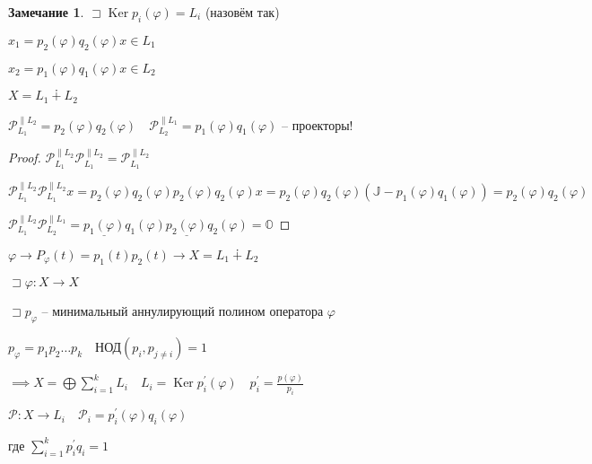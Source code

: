 \documentclass{book}
\newcommand{\p}[1]{#1^{\prime}}
\DeclareMathOperator{\Ker}{Ker}
\theoremstyle{definition}
\newtheorem*{note}{Замечание}
\begin{document}
\begin{note}
    $\sqsupset \Ker p_i\left( \varphi \right)  = L_i$ (назовём так)

    $x_1 = p_2\left( \varphi \right) q_2\left( \varphi \right) x\in L_1$
    
    $x_2 = p_1\left( \varphi \right) q_1\left( \varphi \right) x\in L_2$

    $X = L_1\dotplus L_2$
\end{note}

\begin{lemma}
    $\mathscr{P}_{L_1}^{\parallel L_2} = p_2(\varphi)q_2\left( \varphi \right) \quad \mathscr{P}_{L_2}^{\parallel L_1} = p_1\left( \varphi \right) q_1\left( \varphi \right) $ -- проекторы!
\end{lemma}
\begin{proof}
    $\mathscr{P}_{L_1}^{\parallel L_2} \mathscr{P}_{L_1}^{\parallel L_2} = \mathscr{P}_{L_1}^{\parallel L_2}$

    $\mathscr{P}_{L_1}^{\parallel L_2}\mathscr{P}_{L_1}^{\parallel L_2}x = p_2\left( \varphi \right) q_2\left( \varphi \right) p_2\left( \varphi \right) q_2\left( \varphi \right) x = p_2\left( \varphi \right) q_2\left( \varphi \right) \left( \mathds{J} - p_1\left( \varphi \right) q_1\left( \varphi \right)  \right)  = p_2\left( \varphi \right) q_2\left( \varphi \right) $ 

    $\mathcal{P}_{L_1}^{\parallel L_2}\mathcal{P}_{L_2}^{\parallel L_1} = \underline{p_1\left( \varphi \right)} q_1\left( \varphi \right) \underline{p_2\left( \varphi \right)} q_2\left( \varphi \right)  = \mathds{O}$
\end{proof}


$\varphi \to P_{\varphi}(t) = p_1(t)p_2(t) \to X = L_1 \dotplus L_2$

\begin{theorem}
    $\sqsupset \varphi:X\to X$

    $\sqsupset p_{\varphi}$ -- минимальный аннулирующий полином оператора $\varphi$

    $p_{\varphi} = p_1 p_2 \ldots p_k\quad \text{НОД}\left( p_i, p_{j\neq i} \right)=1 $ 

    $\implies X = \bigoplus \sum_{i=1}^{k} L_i\quad L_i = \Ker \p p_i\left( \varphi \right) \quad \p p_i = \frac{p\left( \varphi \right) }{p_i}$ 

    $\mathscr{P}:X \to L_i\quad \mathscr{P}_i = \p p_i\left( \varphi \right) q_i\left( \varphi \right) $

   где $\sum_{i=1}^{k} \p p_iq_i = 1$
\end{theorem}
\end{document}
